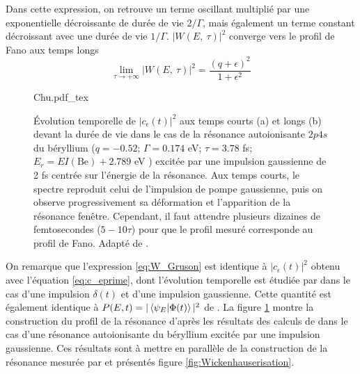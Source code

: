 Dans cette expression, on retrouve un terme oscillant multiplié par une exponentielle décroissante de durée de vie $2/\Gamma$, mais également un terme constant décroissant avec une durée de vie $1/\Gamma$. $|W(E, \:  \tau)|^2$ converge vers le profil de Fano aux temps longs
\begin{equation}
\lim\limits_{\tau \rightarrow + \infty} |W(E, \:  \tau)|^2 = \frac{(q+\epsilon)^2}{1+\epsilon^2}
\end{equation}

\begin{figure}[!ht]
\centering
\def\svgwidth{0.6\textwidth}
{Chu.pdf_tex}
\caption{\'{E}volution temporelle de $|c_{\epsilon}(t)|^2$ aux temps courts (a) et longs (b) devant la durée de vie dans le cas de la résonance autoionisante $2p4s$ du béryllium ($q = -0.52$; $\Gamma = 0.174$ eV; $\tau = 3.78$ fs; $E_r = EI(\text{Be}) + 2.789$ eV ) excitée par une impulsion gaussienne de 2 fs centrée sur l'énergie de la résonance. Aux temps courts, le spectre reproduit celui de l'impulsion de pompe gaussienne, puis on observe progressivement sa déformation et l'apparition de la résonance fenêtre. Cependant, il faut attendre plusieurs dizaines de femtosecondes ($5-10 \tau$) pour que le profil mesuré corresponde au profil de Fano.  Adapté de .}
\label{fig:Chu}
\end{figure}

On remarque que l'expression \ref{eq:W_Gruson} est identique à $|c_{\epsilon}(t)|^2$ obtenu avec l'équation \ref{eq:c_eprime}, dont l'évolution temporelle est étudiée par  dans le cas d'une impulsion $\delta(t)$ et d'une impulsion gaussienne. Cette quantité est également identique à $P(E,t)=|\braket{\psi_E | \Phi(t)}|^2$ de . La figure \ref{fig:Chu} montre la construction du profil de la résonance d'après les résultats des calculs de  dans le cas d'une résonance autoionisante du béryllium excitée par une impulsion gaussienne. Ces résultats sont à mettre en parallèle de la construction de la résonance mesurée par  et présentés figure \ref{fig:Wickenhauserisation}. 


